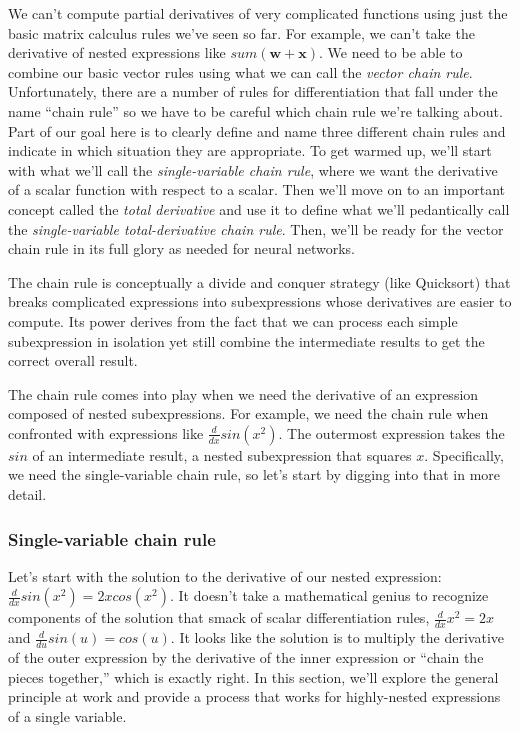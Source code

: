 \documentclass[11pt]{article}
\begin{document}
We can't compute partial derivatives of very complicated functions using just the basic matrix calculus rules we've seen so far.  For example, we can't take the derivative of nested expressions like $sum(\mathbf{w}+\mathbf{x})$. We need to be able to combine our basic vector rules using what we can call the {\em vector chain rule}.   Unfortunately, there are a number of rules for differentiation that fall under the name ``chain rule'' so we have to be careful which chain rule we're talking about. Part of our goal here is to clearly define and name three different chain rules and indicate in which situation they are appropriate. To get warmed up, we'll start with what we'll call the {\em single-variable chain rule}, where we want the derivative of a scalar function with respect to a scalar. Then we'll move on to an important concept called the {\em total derivative} and use it to define what we'll pedantically call the {\em single-variable total-derivative chain rule}. Then, we'll be ready for the vector chain rule in its full glory as needed for neural networks.

The chain rule is conceptually a divide and conquer strategy (like Quicksort) that breaks complicated expressions into subexpressions whose derivatives are easier to compute.  Its power derives from the fact that we can process each simple subexpression in isolation yet still combine the  intermediate results to get the correct overall result.

The chain rule comes into play when we need the derivative of an expression composed of nested subexpressions. For example, we need the chain rule when confronted with expressions like $\frac{d}{dx} sin(x^2)$.  The outermost expression takes the $sin$ of an intermediate result, a nested subexpression that squares $x$. Specifically, we need the single-variable chain rule, so let's start by digging into that in more detail.

\subsubsection{Single-variable chain rule}

Let's start with the solution to the derivative of our nested expression: $\frac{d}{dx} sin(x^2) = 2xcos(x^2)$.  It doesn't take a mathematical genius to recognize components of the solution that smack of scalar differentiation rules, $\frac{d}{dx}x^2 = 2x$ and $\frac{d}{du} sin(u) = cos(u)$. It looks like the solution is to multiply the derivative of the outer expression by the derivative of the inner expression or ``chain the pieces together,'' which is exactly right. In this section, we'll explore the general principle at work and provide a process that works for highly-nested expressions of a single variable.
\end{document}
